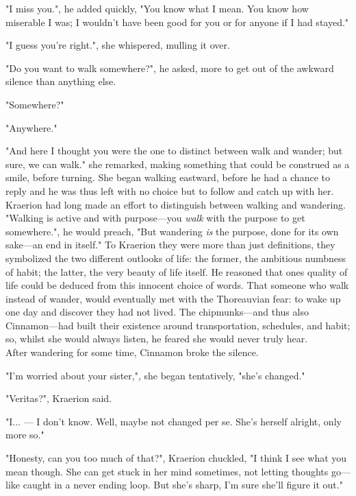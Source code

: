 "I miss you.", he added quickly, "You know what I mean. You know how miserable I was; I wouldn't have been good for you or for anyone if I had stayed."

"I guess you're right.", she whispered, mulling it over.

"Do you want to walk somewhere?", he asked, more to get out of the awkward silence than anything else.

"Somewhere?"

"Anywhere."

"And here I thought you were the one to distinct between walk and wander; but sure, we can walk." she remarked, making something that could be construed as a smile, before turning. She began walking eastward, before he had a chance to reply and he was thus left with no choice but to follow and catch up with her.\\

Kraerion had long made an effort to distinguish between walking and wandering. "Walking is active and with purpose---you \textit{walk} with the purpose to get somewhere.", he would preach, "But wandering \textit{is} the purpose, done for its own sake---an end in itself." To Kraerion they were more than just definitions, they symbolized the two different outlooks of life: the former, the ambitious numbness of habit; the latter, the very beauty of life itself. He reasoned that ones quality of life could be deduced from this innocent choice of words. That someone who walk instead of wander, would eventually met with the Thoreauvian fear: to wake up one day and discover they had not lived. The chipmunks---and thus also Cinnamon---had built their existence around transportation, schedules, and habit; so, whilst she would always listen, he feared she would never truly hear.\\

After wandering for some time, Cinnamon broke the silence. 

"I'm worried about your sister,", she began tentatively, "she's changed."

"Veritas?", Kraerion said.

"I... --- I don't know. Well, maybe not changed per se. She's herself alright, only more so."

"Honesty, can you too much of that?", Kraerion chuckled, "I think I see what you mean though. She can get stuck in her mind sometimes, not letting thoughts go---like caught in a never ending loop. But she's sharp, I'm sure she'll figure it out."

